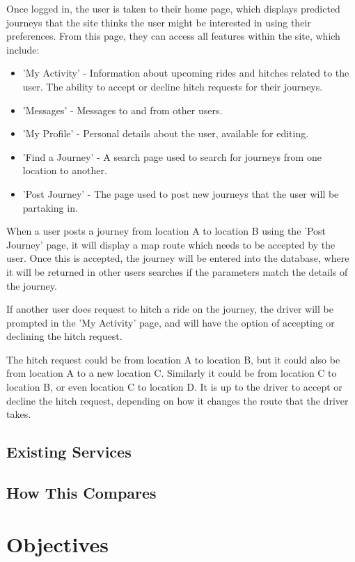\documentclass[11pt]{article}
\begin{document}
	Once logged in, the user is taken to their home page, which displays predicted journeys that the site thinks the user might be interested in using their preferences. From this page, they can access all features within the site, which include:
	\begin{itemize}
		\item 'My Activity' - Information about upcoming rides and hitches related to the user. The ability to accept or decline hitch requests for their journeys.
		\item 'Messages' - Messages to and from other users.
		\item 'My Profile' - Personal details about the user, available for editing.
		\item 'Find a Journey' - A search page used to search for journeys from one location to another.
		\item 'Post Journey' - The page used to post new journeys that the user will be partaking in.		
	\end{itemize}
	
	When a user posts a journey from location A to location B using the 'Post Journey' page, it will display a map route which needs to be accepted by the user. Once this is accepted, the journey will be entered into the database, where it will be returned in other users searches if the parameters match the details of the journey.
	
	If another user does request to hitch a ride on the journey, the driver will be prompted in the 'My Activity' page, and will have the option of accepting or declining the hitch request. 
	
	The hitch request could be from location A to location B, but it could also be from location A to a new location C. Similarly it could be from location C to location B, or even location C to location D. It is up to the driver to accept or decline the hitch request, depending on how it changes the route that the driver takes.
	
	\subsection{Existing Services}
	\subsection{How This Compares}
	
\section{Objectives}
\end{document}

